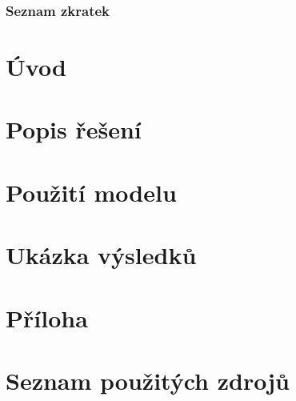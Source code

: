\documentclass[a4paper, 11pt, twoside]{article}
\begin{document}
  \thispagestyle{empty}
  



  \newpage
  \setcounter{page}{1} %
  \tableofcontents{}


  \newpage
  \section*{Seznam zkratek}
  \begin{multicols}{2}
  
  \end{multicols}



  \newpage
  \setcounter{page}{1}%
  \part*{Úvod}
  


  \newpage
  \part{Popis řešení}\label{cast:1}
  




  \newpage
  \setcounter{section}{0}
  \part{Použití modelu}\label{cast:2}
  

  \newpage
  \setcounter{section}{0}
  \part{Ukázka výsledků}\label{cast:3}
  


  \newpage
  \appendix
  \part*{Příloha}
  




  \newpage

  \part*{Seznam použitých zdrojů}
  
  
\end{document}
